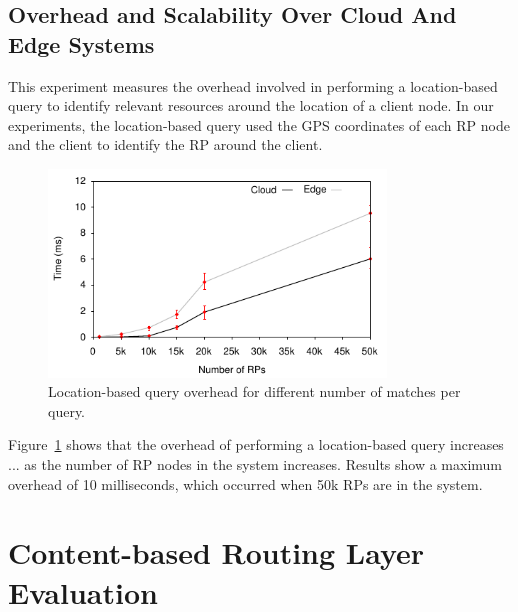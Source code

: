 \subsection{Overhead and Scalability Over Cloud And Edge Systems}

This experiment measures the overhead involved in performing a location-based query to identify relevant resources around the location of a client node. In our experiments, the location-based query used the GPS coordinates of each RP node and the client to identify the RP around the client.

\begin{figure}[htb!]
  \centering
    \includegraphics[width=0.8\textwidth]{Figures/OSLocation.pdf}
  \caption{Location-based query overhead for different number of matches per query.} \label{fig:oslocation}
\end{figure}

Figure~\ref{fig:oslocation} shows that the overhead of performing a location-based query increases ... as the number of RP nodes in the system increases. Results show a maximum overhead of 10 milliseconds, which occurred when 50k RPs are in the system. 

\section{Content-based Routing Layer Evaluation}

